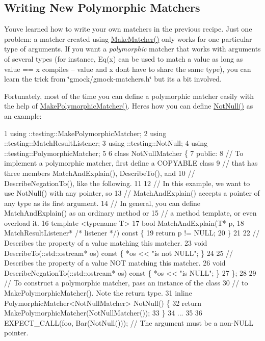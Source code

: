 \subsection*{Writing New Polymorphic Matchers}

You\textquotesingle{}ve learned how to write your own matchers in the previous recipe. Just one problem\+: a matcher created using {\ttfamily \hyperlink{namespacetesting_a37fd8029ac00e60952440a3d9cca8166}{Make\+Matcher()}} only works for one particular type of arguments. If you want a {\itshape polymorphic} matcher that works with arguments of several types (for instance, {\ttfamily Eq(x)} can be used to match a {\ttfamily value} as long as {\ttfamily value} == {\ttfamily x} compiles -- {\ttfamily value} and {\ttfamily x} don\textquotesingle{}t have to share the same type), you can learn the trick from {\ttfamily \char`\"{}gmock/gmock-\/matchers.\+h\char`\"{}} but it\textquotesingle{}s a bit involved.

Fortunately, most of the time you can define a polymorphic matcher easily with the help of {\ttfamily \hyperlink{namespacetesting_a667ca94f190ec2e17ee2fbfdb7d3da04}{Make\+Polymorphic\+Matcher()}}. Here\textquotesingle{}s how you can define {\ttfamily \hyperlink{namespacetesting_a39d1f92b53b8b2a0b6db6a22ac146416}{Not\+Null()}} as an example\+:


\begin{DoxyCode}
1 using ::testing::MakePolymorphicMatcher;
2 using ::testing::MatchResultListener;
3 using ::testing::NotNull;
4 using ::testing::PolymorphicMatcher;
5 
6 class NotNullMatcher \{
7  public:
8   // To implement a polymorphic matcher, first define a COPYABLE class
9   // that has three members MatchAndExplain(), DescribeTo(), and
10   // DescribeNegationTo(), like the following.
11 
12   // In this example, we want to use NotNull() with any pointer, so
13   // MatchAndExplain() accepts a pointer of any type as its first argument.
14   // In general, you can define MatchAndExplain() as an ordinary method or
15   // a method template, or even overload it.
16   template <typename T>
17   bool MatchAndExplain(T* p,
18                        MatchResultListener* /* listener */) const \{
19     return p != NULL;
20   \}
21 
22   // Describes the property of a value matching this matcher.
23   void DescribeTo(::std::ostream* os) const \{ *os << "is not NULL"; \}
24 
25   // Describes the property of a value NOT matching this matcher.
26   void DescribeNegationTo(::std::ostream* os) const \{ *os << "is NULL"; \}
27 \};
28 
29 // To construct a polymorphic matcher, pass an instance of the class
30 // to MakePolymorphicMatcher().  Note the return type.
31 inline PolymorphicMatcher<NotNullMatcher> NotNull() \{
32   return MakePolymorphicMatcher(NotNullMatcher());
33 \}
34 ...
35 
36   EXPECT\_CALL(foo, Bar(NotNull()));  // The argument must be a non-NULL pointer.
\end{DoxyCode}


